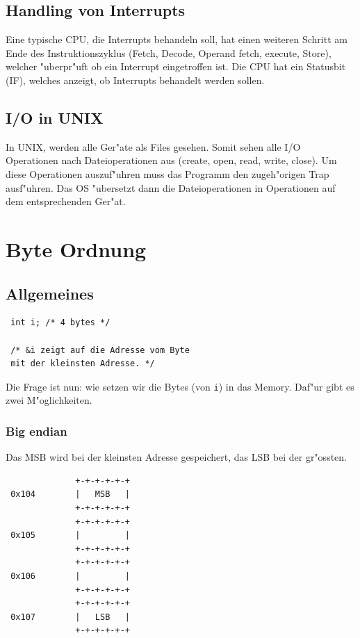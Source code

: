 \documentclass[german, 10pt, a4paper, twocolumn]{scrartcl}
\begin{document}

\subsection{Handling von Interrupts}

Eine typische CPU, die Interrupts behandeln soll, hat einen weiteren Schritt am Ende des Instruktionszyklus (Fetch, Decode, Operand fetch, execute, Store), welcher "uberpr"uft ob ein Interrupt eingetroffen ist. Die CPU hat ein Statusbit (IF), welches anzeigt, ob Interrupts behandelt werden sollen.

\subsection{I/O in UNIX}

In UNIX, werden alle Ger"ate als Files gesehen. Somit sehen alle I/O Operationen nach Dateioperationen aus (create, open, read, write, close). Um diese Operationen auszuf"uhren muss das Programm den zugeh"origen Trap ausf"uhren. Das OS "ubersetzt dann die Dateioperationen in Operationen auf dem entsprechenden Ger"at.

\section{Byte Ordnung}

\subsection{Allgemeines}

\begin{verbatim}
 int i; /* 4 bytes */

 /* &i zeigt auf die Adresse vom Byte
 mit der kleinsten Adresse. */
\end{verbatim}

Die Frage ist nun: wie setzen wir die Bytes (von \verb#i#) in das Memory. Daf"ur gibt es zwei M"oglichkeiten.

\subsubsection{Big endian}

Das MSB wird bei der kleinsten Adresse gespeichert, das LSB bei der gr"ossten.

\small
\begin{verbatim}
              +-+-+-+-+-+
 0x104        |   MSB   |
              +-+-+-+-+-+
              +-+-+-+-+-+
 0x105        |         |
              +-+-+-+-+-+
              +-+-+-+-+-+
 0x106        |         |
              +-+-+-+-+-+
              +-+-+-+-+-+
 0x107        |   LSB   |
              +-+-+-+-+-+
\end{verbatim}
\normalsize
\end{document}
